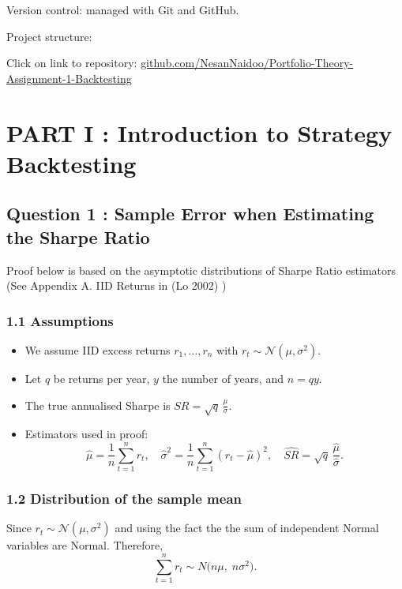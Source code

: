 \documentclass[
  12pt,
]{article}
\begin{document}
Version control: managed with Git and GitHub.

Project structure:

Click on link to repository:
\href{https://github.com/NesanNaidoo/Portfolio-Theory-Assignment-1-Backtesting}{github.com/NesanNaidoo/Portfolio-Theory-Assignment-1-Backtesting}

\section{PART I : Introduction to Strategy
Backtesting}\label{part-i-introduction-to-strategy-backtesting}

\subsection{Question 1 : Sample Error when Estimating the Sharpe
Ratio}\label{question-1-sample-error-when-estimating-the-sharpe-ratio}

Proof below is based on the asymptotic distributions of Sharpe Ratio
estimators (See Appendix A. IID Returns in (Lo 2002) )

\subsubsection{1.1 Assumptions}\label{assumptions}

\begin{itemize}
\item
  We assume IID excess returns \(r_1,\dots,r_n\) with
  \(r_t \sim \mathcal{N}(\mu,\sigma^2).\)
\item
  Let \(q\) be returns per year, \(y\) the number of years, and
  \(n=qy\).
\item
  The true annualised Sharpe is \(SR=\sqrt{q}\,\frac{\mu}{\sigma}.\)
\item
  Estimators used in proof: \[
  \widehat\mu=\frac{1}{n}\sum_{t=1}^n r_t,\quad
  \widehat\sigma^2=\frac{1}{n}\sum_{t=1}^n (r_t-\widehat\mu)^2,\quad
  \widehat{SR}=\sqrt{q}\,\frac{\widehat\mu}{\widehat\sigma}.
  \]
\end{itemize}

\subsubsection{1.2 Distribution of the sample
mean}\label{distribution-of-the-sample-mean}

Since \(r_t\sim \mathcal{N}(\mu,\sigma^2)\) and using the fact the the
sum of independent Normal variables are Normal. Therefore,\[
\sum_{t=1}^n r_t \sim N\!\big(n\mu,\; n\sigma^2\big). \tag{1}
\]
\end{document}
